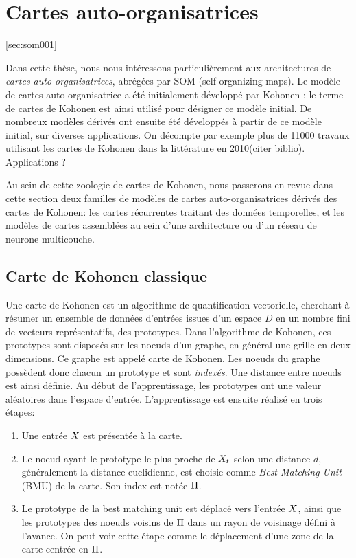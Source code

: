 \section{Cartes auto-organisatrices}\ref{sec:som001}

Dans cette thèse, nous nous intéressons particulièrement aux architectures de \emph{cartes auto-organisatrices}, abrégées par SOM (self-organizing maps). Le modèle de cartes auto-organisatrice a été initialement développé par Kohonen \cite{Kohonen1982}; le terme de cartes de Kohonen est ainsi utilisé pour désigner ce modèle initial. De nombreux modèles dérivés ont ensuite été développés à partir de ce modèle initial, sur diverses applications. On décompte par exemple plus de 11000 travaux utilisant les cartes de Kohonen dans la littérature en 2010(citer biblio).
Applications ?

Au sein de cette zoologie de cartes de Kohonen, nous passerons en revue dans cette section deux familles de modèles de cartes auto-organisatrices dérivés des cartes de Kohonen: les cartes récurrentes traitant des données temporelles, et les modèles de cartes assemblées au sein d'une architecture ou d'un réseau de neurone multicouche.

\subsection{Carte de Kohonen classique}

Une carte de Kohonen est un algorithme de quantification vectorielle, cherchant à résumer un ensemble de données d'entrées issues d'un espace $D$ en un nombre fini de vecteurs représentatifs, des prototypes.  Dans l'algorithme de Kohonen, ces prototypes sont disposés sur les noeuds d'un graphe, en général une grille en deux dimensions. Ce graphe est appelé carte de Kohonen. Les noeuds du graphe possèdent donc chacun un prototype et sont \emph{indexés}. Une distance entre noeuds est ainsi définie.
Au début de l'apprentissage, les prototypes ont une valeur aléatoires dans l'espace d'entrée. L'apprentissage est ensuite réalisé en trois étapes:
\begin{enumerate}
\item Une entrée $X$ est présentée à la carte.
\item Le noeud ayant le prototype le plus proche de $X_t$ selon une distance $d$, généralement la distance euclidienne, est choisie comme \emph{Best Matching Unit} (BMU) de la carte. Son index est notée $\Pi$.
\item Le prototype de la best matching unit est déplacé vers l'entrée $X$, ainsi que les prototypes des noeuds voisins de $\Pi$ dans un rayon de voisinage défini à l'avance. On peut voir cette étape comme le déplacement d'une zone de la carte centrée en $\Pi$.
\end{enumerate}

